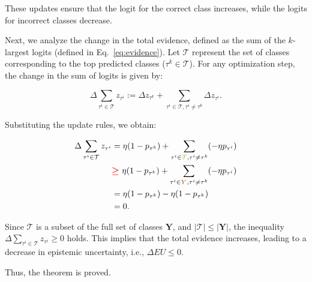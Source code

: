 These updates ensure that the logit for the correct class increases, while the logits for incorrect classes decrease. 

Next, we analyze the change in the total evidence, defined as the sum of the $k$-largest logits (defined in Eq.~\ref{eq:evidence}). Let \( \mathcal{T} \) represent the set of classes corresponding to the top predicted classes (\(\tau^k \in \mathcal{T}\)). For any optimization step, the change in the sum of logits is given by:

\[
\Delta\sum_{\tau^i \in \mathcal{T}} z_{\tau^i} := \Delta z_{\tau^k} + \sum_{\tau^i \in \mathcal{T}, \tau^i \neq \tau^k} \Delta z_{\tau^i}.
\]

Substituting the update rules, we obtain:

\begin{equation}
\begin{aligned}
\Delta\sum_{\tau^i \in \mathcal{T}} z_{\tau^i} & = \eta(1 - p_{\tau^k}) + \sum_{\tau^i \in \textcolor{brown}{\mathcal{T}}, \tau^i \neq \tau^k} (-\eta p_{\tau^i}) \\ & \textcolor{red}{\bm{\geq}} ~\eta(1 - p_{\tau^k}) + \sum_{\tau^i \in \textcolor{brown}{\bm{Y}}, \tau^i \neq \tau^k} (-\eta p_{\tau^i}) \\ &= \eta(1 - p_{\tau^k}) - \eta(1 - p_{\tau^k})
\\&= 0.    
\end{aligned}    
\end{equation}

Since \( \mathcal{T} \) is a subset of the full set of classes \( \bm{Y} \), and \( |\mathcal{T}| \leq |\bm{Y}| \), the inequality \( \Delta\sum_{\tau^i \in \mathcal{T}} z_{\tau^i} \geq 0 \) holds. This implies that the total evidence increases, leading to a decrease in epistemic uncertainty, i.e., \( \Delta EU \leq 0 \). 

Thus, the theorem is proved.










